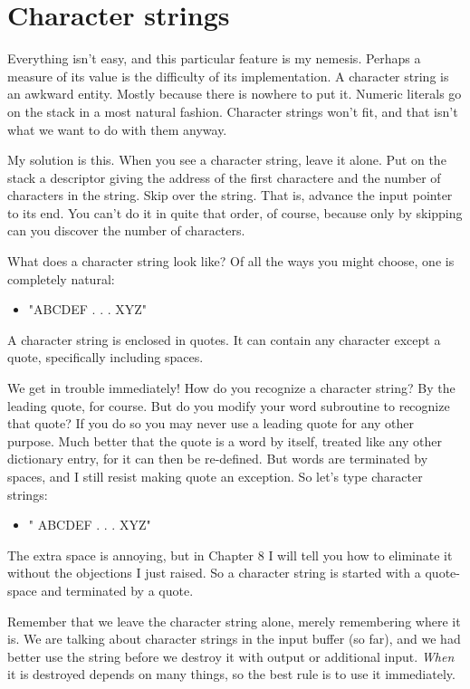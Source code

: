 \documentclass[b5paper, oneside]{book}
\begin{document}
\section{Character strings}
Everything isn't easy, and this particular feature is my nemesis. Perhaps a measure of its value is the difficulty of its implementation. A character string is an awkward entity. Mostly because there is nowhere to put it. Numeric literals go on the stack in a most natural fashion. Character strings won't fit, and that isn't what we want to do with them anyway.

My solution is this. When you see a character string, leave it alone. Put on the stack a descriptor giving the address of the first charactere and the number of characters in the string. Skip over the string. That is, advance the input pointer to its end. You can't do it in quite that order, of course, because only by skipping can you discover the number of characters.

What does a character string look like? Of all the ways you might choose, one is completely natural:\begin{itemize}
   \item "ABCDEF . . . XYZ"\end{itemize}
A character string is enclosed in quotes. It can contain any character except a quote, specifically including spaces.

We get in trouble immediately! How do you recognize a character string? By the leading quote, for course. But do you modify your word subroutine to recognize that quote? If you do so you may never use a leading quote for any other purpose. Much better that the quote is a word by itself, treated like any other dictionary entry, for it can then be re-defined. But words are terminated by spaces, and I still resist making quote an exception. So let's type character strings:\begin{itemize}
   \item " ABCDEF . . . XYZ"\end{itemize}
The extra space is annoying, but in Chapter 8 I will tell you how to eliminate it without the objections I just raised. So a character string is started with a quote-space and terminated by a quote.

Remember that we leave the character string alone, merely remembering where it is. We are talking about character strings in the input buffer (so far), and we had better use the string before we destroy it with output or additional input. {\em When} it is destroyed depends on many things, so the best rule is to use it immediately.
\end{document}
